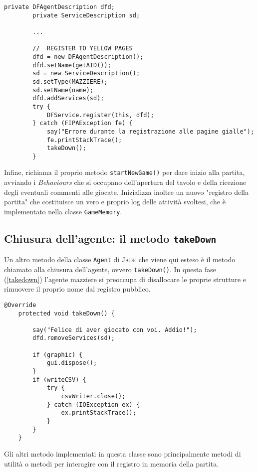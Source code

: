 \begin{lstlisting}[caption={stralcio del metodo setup() di MazziereAgent: registrazione al servizio pagine gialle},label=setup2]
        private DFAgentDescription dfd;
        private ServiceDescription sd;
        
        ...
        
        //  REGISTER TO YELLOW PAGES
        dfd = new DFAgentDescription();
        dfd.setName(getAID());
        sd = new ServiceDescription();
        sd.setType(MAZZIERE);
        sd.setName(name);
        dfd.addServices(sd);
        try {
            DFService.register(this, dfd);
        } catch (FIPAException fe) {
            say("Errore durante la registrazione alle pagine gialle");
            fe.printStackTrace();
            takeDown();
        }
\end{lstlisting}

Infine, richiama il proprio metodo \texttt{startNewGame()} per dare inizio alla partita, avviando i \emph{Behaviours} che si occupano dell'apertura del tavolo e della ricezione degli eventuali commenti alle giocate.
Inizializza inoltre un nuovo "registro della partita" che costituisce un vero e proprio log delle attività svoltesi, che è implementato nella classe \texttt{GameMemory}.







\subsection{Chiusura dell'agente: il metodo \texttt{takeDown}}
Un altro metodo della classe \texttt{Agent} di \textsc{Jade} che viene qui esteso è il metodo chiamato alla chiusura dell'agente, ovvero \texttt{takeDown()}.
In questa fase (\ref{takedown}) l'agente mazziere si preoccupa di disallocare le proprie strutture e rimuovere il proprio nome dal registro pubblico.
\begin{lstlisting}[caption={il metodo takeDown di MazziereAgent},label=takedown]
    @Override
    protected void takeDown() {

        say("Felice di aver giocato con voi. Addio!");
        dfd.removeServices(sd);

        if (graphic) {
            gui.dispose();
        }
        if (writeCSV) {
            try {
                csvWriter.close();
            } catch (IOException ex) {
                ex.printStackTrace();
            }
        }
    }
\end{lstlisting}

Gli altri metodo implementati in questa classe sono principalmente metodi di utilità o metodi per interagire con il registro in memoria della partita.
